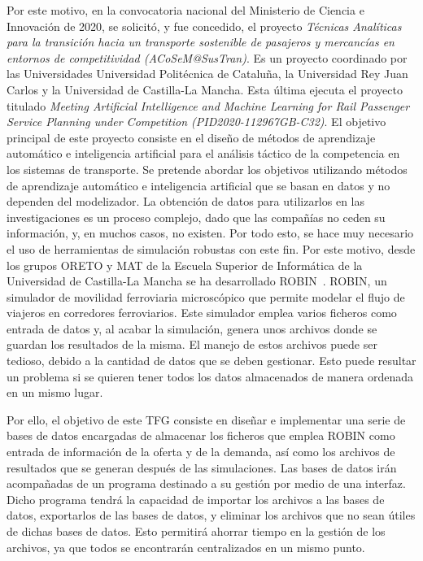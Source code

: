 Por este motivo, en la convocatoria nacional del Ministerio de Ciencia e Innovación de 2020, se solicitó, y fue concedido, el proyecto \textit{Técnicas Analíticas para la transición hacia un transporte sostenible de pasajeros y mercancías en entornos de competitividad (ACoSeM@SusTran)}. Es un proyecto coordinado por las Universidades Universidad Politécnica de Cataluña, la Universidad Rey Juan Carlos y la Universidad de Castilla-La Mancha. Esta última ejecuta el proyecto titulado \textit{Meeting Artificial Intelligence and Machine Learning for Rail Passenger Service Planning under Competition (PID2020-112967GB-C32)}. El objetivo principal de este proyecto consiste en el diseño de métodos de aprendizaje automático e inteligencia artificial para el análisis táctico de la competencia en los sistemas de transporte. Se pretende abordar los objetivos utilizando métodos de aprendizaje automático e inteligencia artificial que se basan en datos y no dependen del modelizador. La obtención de datos para utilizarlos en las investigaciones es un proceso complejo, dado que las compañías no ceden su información, y, en muchos casos, no existen. Por todo esto, se hace muy necesario el uso de herramientas de simulación robustas con este fin. Por este motivo, desde los grupos ORETO y MAT de la Escuela Superior de Informática de la Universidad de Castilla-La Mancha se ha desarrollado \acrfull{ROBIN}~\cite{delCastilloHerrera2024ROBIN}. \acrshort{ROBIN}, un simulador de movilidad ferroviaria microscópico que permite modelar el flujo de viajeros en corredores ferroviarios. Este simulador emplea varios ficheros como entrada de datos y, al acabar la simulación, genera unos archivos donde se guardan los resultados de la misma. El manejo de estos archivos puede ser tedioso, debido a la cantidad de datos que se deben gestionar. Esto puede resultar un problema si se quieren tener todos los datos almacenados de manera ordenada en un mismo lugar. 

Por ello, el objetivo de este \acrshort{TFG} consiste en diseñar e implementar una serie de bases de datos encargadas de almacenar los ficheros que emplea \acrshort{ROBIN} como entrada de información de la oferta y de la demanda, así como los archivos de resultados que se generan después de las simulaciones. Las bases de datos irán acompañadas de un programa destinado a su gestión por medio de una interfaz. Dicho programa tendrá la capacidad de importar los archivos a las bases de datos, exportarlos de las bases de datos, y eliminar los archivos que no sean útiles de dichas bases de datos. Esto permitirá ahorrar tiempo en la gestión de los archivos, ya que todos se encontrarán centralizados en un mismo punto.

